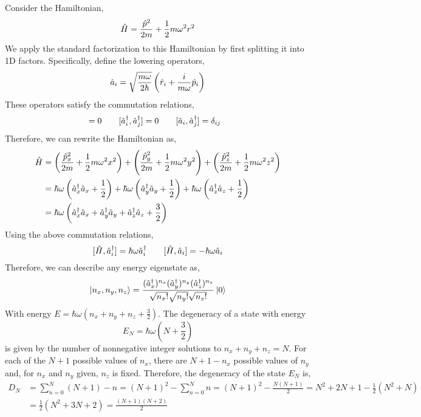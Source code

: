 \documentclass[12pt]{extarticle}
\begin{document}
Consider the Hamiltonian, 
\[\hat{H} = \frac{\hat{p}^2}{2m} + \frac{1}{2} m \omega^2 r^2\]
We apply the standard factorization to this Hamiltonian by first splitting it into 1D factors. Specifically, define the lowering operators,
\[\hat{a}_i = \sqrt{\frac{m \omega}{2 \hbar}} \left(\hat{r}_i + \frac{i}{m \omega} \hat{p}_i \right)\]
These operators satisfy the commutation relations,
\begin{align*}
[\a_i, \a_j] &= 0 \quad \quad
[\adag_i, \adag_j] = 0  \quad \quad [\a_i, \adag_j] = \delta_{ij}
\end{align*}
Therefore, we can rewrite the Hamiltonian as,
\begin{align*}
\hat{H} & = \left(\frac{\hat{p}^2_x}{2m} + \frac{1}{2} m \omega^2 x^2 \right) + \left(\frac{\hat{p}^2_y}{2m} + \frac{1}{2} m \omega^2 y^2 \right) + \left(\frac{\hat{p}^2_z}{2m} + \frac{1}{2} m \omega^2 z^2 \right) \\
& =  \hbar \omega \left(\hat{a}^\dagger_x \hat{a}_x + \frac{1}{2} \right) + \hbar \omega \left(\hat{a}^\dagger_y \hat{a}_y + \frac{1}{2} \right) + \hbar \omega \left(\hat{a}^\dagger_z \hat{a}_z + \frac{1}{2} \right) \\
& = \hbar \omega \left(\hat{a}^\dagger_x \hat{a}_x + \hat{a}^\dagger_y \hat{a}_y + \hat{a}^\dagger_z \hat{a}_z + \frac{3}{2} \right)
\end{align*}
Using the above commutation relations,
\[ [\hat{H}, \hat{a}^\dagger_i] = \hbar \omega \hat{a}^\dagger_i \quad \quad [\hat{H}, \hat{a}_i] = - \hbar \omega \hat{a}_i\] 
Therefore, we can describe any energy eigenstate as,
\[\left| n_x, n_y, n_z \right> = \frac{(\hat{a}^\dagger_x)^{n_x} (\hat{a}^\dagger_y)^{n_y} (\hat{a}^\dagger_z)^{n_z}}{\sqrt{n_x!} \sqrt{n_y!} \sqrt{n_z!}} \left| 0 \right>\]
With energy $E = \hbar \omega \left( n_x + n_y + n_z + \frac{3}{2} \right)$. The degeneracy of a state with energy \[E_N = \hbar \omega (N + \frac{3}{2})\] is given by the number of nonnegative integer solutions to $n_x + n_y + n_z = N$. For each of the $N + 1$ possible values of $n_x$, there are $N + 1 - n_x$ possible values of $n_y$ and, for $n_x$ and $n_y$ given, $n_z$ is fixed. Therefore, the degeneracy of the state $E_N$ is,
\begin{align*}
D_N & = \sum_{n = 0}^N (N + 1) - n = (N + 1)^2 - \sum_{n = 0}^N n = (N + 1)^2 - \frac{N(N + 1)}{2} = N^2 + 2 N + 1 - \frac{1}{2} (N^2 + N) \\ & = \frac{1}{2} (N^2 + 3 N + 2) = \frac{(N + 1)(N + 2)}{2}
\end{align*}   
\end{document}
